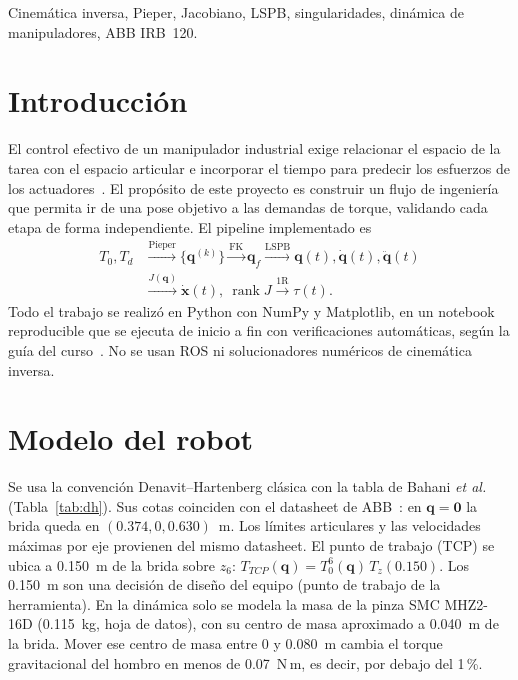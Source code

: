 \documentclass[conference]{IEEEtran}
\begin{document}
\begin{IEEEkeywords}
Cinemática inversa, Pieper, Jacobiano, LSPB, singularidades, dinámica de manipuladores, ABB IRB~120.
\end{IEEEkeywords}

\section{Introducción}
El control efectivo de un manipulador industrial exige relacionar el espacio de la tarea con el espacio articular e
incorporar el tiempo para predecir los esfuerzos de los actuadores~\cite{siciliano}. El propósito de este proyecto es
construir un flujo de ingeniería que permita ir de una pose objetivo a las demandas de torque, validando cada etapa
de forma independiente. El pipeline implementado es
\begin{align*}
T_0, T_d &\xrightarrow{\text{Pieper}} \{\mathbf{q}^{(k)}\} \xrightarrow{\text{FK}} \mathbf{q}_f
\xrightarrow{\text{LSPB}} \mathbf{q}(t),\dot{\mathbf{q}}(t),\ddot{\mathbf{q}}(t)\\
&\xrightarrow{J(\mathbf{q})} \dot{\mathbf{x}}(t),\ \operatorname{rank}J \xrightarrow{\text{1R}} \tau(t).
\end{align*}
Todo el trabajo se realizó en Python con NumPy y Matplotlib, en un notebook reproducible que se ejecuta de inicio a fin
con \NChecks{} verificaciones automáticas, según la guía del curso~\cite{guia}. No se usan ROS ni solucionadores numéricos de cinemática inversa.

\section{Modelo del robot}
Se usa la convención Denavit--Hartenberg clásica con la tabla de Bahani \textit{et al.}~\cite{bahani}
(Tabla~\ref{tab:dh}). Sus cotas coinciden con el datasheet de ABB~\cite{abb}: en $\mathbf{q} = \mathbf{0}$ la brida
queda en $(0.374, 0, 0.630)$~m. Los límites articulares y las velocidades máximas por eje provienen del mismo
datasheet. El punto de trabajo (TCP) se ubica a 0.150~m de la brida sobre $z_6$:
$T_{TCP}(\mathbf{q}) = T_0^6(\mathbf{q})\,T_z(0.150)$. Los 0.150~m son una decisión de diseño del equipo (punto de trabajo
de la herramienta). En la dinámica solo se modela la masa de la pinza SMC MHZ2-16D (0.115~kg, hoja de datos), con su
centro de masa aproximado a 0.040~m de la brida. Mover ese centro de masa entre 0 y 0.080~m cambia el torque
gravitacional del hombro en menos de 0.07~N\,m, es decir, por debajo del 1\,\%.
\end{document}

